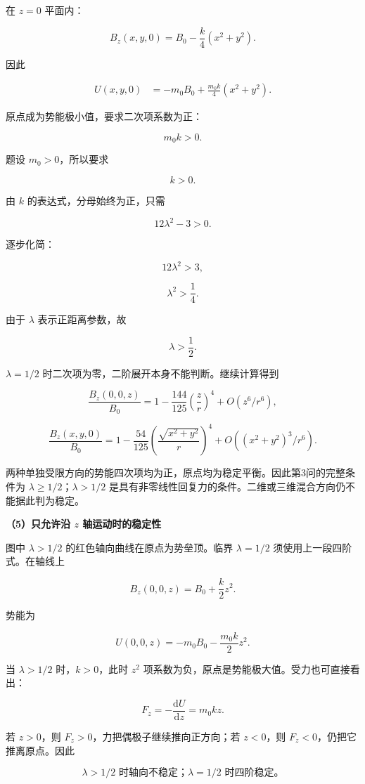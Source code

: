 \documentclass[12pt,a4paper,UTF8]{ctexart}
\begin{document}
在 \(z=0\) 平面内：

\[
B_z(x,y,0)=B_0-\frac k4(x^2+y^2).
\]

因此

\[
\begin{aligned}
U(x,y,0)
&=-m_0B_0+\frac{m_0k}{4}(x^2+y^2).
\end{aligned}
\]

原点成为势能极小值，要求二次项系数为正：

\[m_0k>0.\]

题设 \(m_0>0\)，所以要求

\[k>0.\]

由 \(k\) 的表达式，分母始终为正，只需

\[12\lambda^2-3>0.\]

逐步化简：

\[12\lambda^2>3,\]

\[\lambda^2>\frac14.\]

由于 \(\lambda\) 表示正距离参数，故

\[
\boxed{\lambda>\frac12}.
\]

\(\lambda=1/2\) 时二次项为零，二阶展开本身不能判断。继续计算得到

\[\frac{B_z(0,0,z)}{B_0}=1-\frac{144}{125}\left(\frac zr\right)^4+O(z^6/r^6),\]

\[\frac{B_z(x,y,0)}{B_0}=1-\frac{54}{125}\left(\frac{\sqrt{x^2+y^2}}r\right)^4+O((x^2+y^2)^3/r^6).\]

两种单独受限方向的势能四次项均为正，原点均为稳定平衡。因此第3问的完整条件为
\(\boxed{\lambda\ge1/2}\)；\(\lambda>1/2\)
是具有非零线性回复力的条件。二维或三维混合方向仍不能据此判为稳定。

\textbf{（5）只允许沿 \(z\) 轴运动时的稳定性}

图中 \(\lambda>1/2\) 的红色轴向曲线在原点为势垒顶。临界 \(\lambda=1/2\)
须使用上一段四阶式。在轴线上

\[
B_z(0,0,z)=B_0+\frac k2z^2.
\]

势能为

\[
U(0,0,z)=-m_0B_0-\frac{m_0k}{2}z^2.
\]

当 \(\lambda>1/2\) 时，\(k>0\)，此时 \(z^2\)
项系数为负，原点是势能极大值。受力也可直接看出：

\[
F_z=-\frac{\mathrm{d}U}{\mathrm{d}z}=m_0kz.
\]

若 \(z>0\)，则 \(F_z>0\)，力把偶极子继续推向正方向；若 \(z<0\)，则
\(F_z<0\)，仍把它推离原点。因此

\[
\boxed{\lambda>1/2\text{ 时轴向不稳定；}\lambda=1/2\text{ 时四阶稳定。}}
\]
\end{document}
